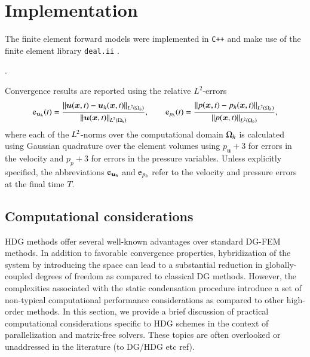 

\section{Implementation}%
\label{sec:implementation_details}

The finite element forward models were implemented in \texttt{C++} and make use of the finite element library \texttt{deal.ii} \cite{dealII93}.

. 

Convergence results are reported using the relative $L^2$-errors 
\begin{equation}
  \text{e}_{\bm{u}_h}(t) = \frac{ \left\lVert \bm{u}(\bm{x}, t) - \bm{u}_h(\bm{x}, t)\right\rVert_{L^2(\Omega_h)} }{ \left\lVert \bm{u}(\bm{x}, t) \right\rVert_{L^2(\Omega_h)} }, \qquad 
  \text{e}_{p_h}(t) =\frac{ \left\lVert p(\bm{x}, t) - p_h(\bm{x}, t)\right\rVert_{L^2(\Omega_h)} }{ \left\lVert p(\bm{x}, t) \right\rVert_{L^2(\Omega_h)} },
\end{equation}
where each of the $L^2$-norms over the computational domain $\Omega_h$ is calculated using Gaussian quadrature over the element volumes using $p_{\bm{u}} + 3$ for errors in the velocity and $p_{p} + 3$ for errors in the pressure variables.
Unless explicitly specified, the abbreviations $\text{e}_{\bm{u}_h}$ and $\text{e}_{p_h}$ refer to the velocity and pressure errors at the final time $T$.

\subsection{Computational considerations}
\label{sec:computational}

HDG methods offer several well-known advantages over standard DG-FEM methods. 
In addition to favorable convergence properties, hybridization of the system by introducing the space  can lead to a substantial reduction in globally-coupled degrees of freedom as compared to classical DG methods.
However, the complexities associated with the static condensation procedure introduce a set of non-typical computational performance considerations as compared to other high-order methods.
In this section, we provide a brief discussion of practical computational considerations specific to HDG schemes in the context of parallelization and matrix-free solvers. These topics are often overlooked or unaddressed in the literature (to DG/HDG etc ref).

